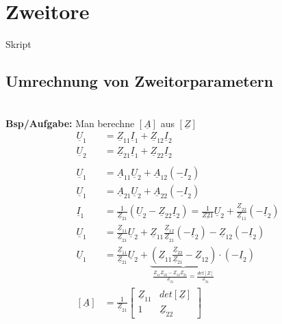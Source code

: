 \section{Zweitore}
Skript\\
\subsection{Umrechnung von Zweitorparametern}
\\
\textbf{Bsp/Aufgabe:} Man berechne $[\underline{A}]$ aus $[\underline{Z}]$\\

\begin{align}
	\underline{U}_1&=\underline{Z}_{11}\underline{I}_1+\underline{Z}_{12}\underline{I}_2\nonumber\\
	\underline{U}_2&=\underline{Z}_{21}\underline{I}_1+\underline{Z}_{22}\underline{I}_2\nonumber\\
	\nonumber\\
	\underline{U}_1&=\underline{A}_{11}\underline{U}_2+\underline{A}_{12}(\underline{-I}_2)\nonumber\\
	\underline{U}_1&=\underline{A}_{21}\underline{U}_2+\underline{A}_{22}(\underline{-I}_2)\nonumber\\
	\underline{I}_1&=\frac{1}{\underline{Z}_{21}}\left(\underline{U}_2-\underline{Z}_{22}\underline{I}_2\right)=\frac{1}{\underline{Z{21}}}\underline{U}_2+\frac{\underline{Z}_{22}}{\underline{Z}_{11}}\left(-\underline{I}_2\right)\nonumber\\
	\underline{U}_1&=\frac{\underline{Z}_{11}}{\underline{Z}_{21}}\underline{U}_2+\underline{Z}_{11}\frac{\underline{Z}_{12}}{\underline{Z}_{21}}\left(-\underline{I}_2\right)-\underline{Z}_{12}\left(-\underline{I}_2\right)\nonumber\\
	\underline{U}_1&=\frac{\underline{Z}_{11}}{\underline{Z}_{21}}\underline{U}_2+\underbrace{\left(\underline{Z}_{11}\frac{\underline{Z}_{22}}{\underline{Z}_{21}}-\underline{Z}_{12}\right)}_{\frac{\underline{Z}_{11}\underline{Z}_{22}-\underline{Z}_{12}\underline{Z}_{21}}{\underline{Z}_{21}}=\frac{det[Z]}{\underline{Z}_{21}}}\cdot\left(-\underline{I}_2\right)\nonumber\\
	[\underline{A}]&=\frac{1}{\underline{Z}_{21}}
	\begin{bmatrix}
		\underline{Z}_{11} & det[\underline{Z}]\\
		1 & \underline{Z}_{22}
	\end{bmatrix}\nonumber
\end{align}

